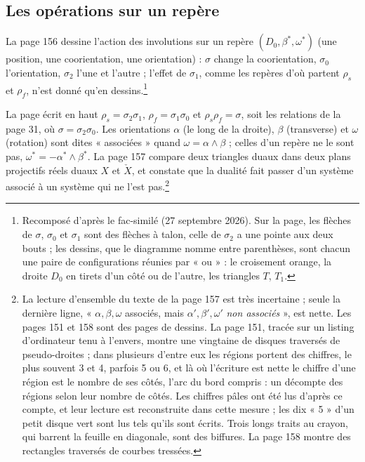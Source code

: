 \documentclass[11pt,a4paper]{article}
\begin{document}
\subsection*{Les opérations sur un repère}

La page 156 dessine l'action des involutions sur un repère $(D_0, \beta^{*},
\omega^{*})$ (une position, une coorientation, une orientation) : $\sigma$
change la coorientation, $\sigma_0$ l'orientation, $\sigma_2$ l'une et l'autre ;
l'effet de $\sigma_1$, comme les repères d'où partent $\rho_s$ et $\rho_f$, n'est
donné qu'en dessins.\footnote{Recomposé d'après le fac-similé (27 septembre
2026). Sur la page, les flèches de $\sigma$, $\sigma_0$ et $\sigma_1$ sont des
flèches à talon, celle de $\sigma_2$ a une pointe aux deux bouts ; les dessins,
que le diagramme nomme entre parenthèses, sont chacun une paire de
configurations réunies par « ou » : le croisement orange, la droite $D_0$ en
tirets d'un côté ou de l'autre, les triangles $T$, $T_1$.}


La page écrit en haut $\rho_s = \sigma_2\sigma_1$, $\rho_f = \sigma_1\sigma_0$ et
$\rho_s\rho_f = \sigma$, soit les relations de la page 31, où $\sigma = \sigma_2\sigma_0$. Les
orientations $\alpha$ (le long de la droite), $\beta$ (transverse) et $\omega$
(rotation) sont dites « associées » quand $\omega = \alpha \wedge \beta$ ; celles
d'un repère ne le sont pas, $\omega^{*} = -\alpha^{*} \wedge \beta^{*}$. La page
157 compare deux triangles duaux dans deux plans projectifs réels duaux $X$ et
$\check{X}$, et constate que la dualité fait passer d'un système associé à un
système qui ne l'est pas.\footnote{La lecture d'ensemble du texte de la page 157
est très incertaine ; seule la dernière ligne, « $\alpha, \beta, \omega$ associés,
mais $\alpha', \beta', \omega'$ \emph{non associés} », est nette. Les pages 151
et 158 sont des pages de dessins. La page 151, tracée sur un listing d'ordinateur
tenu à l'envers, montre une vingtaine de disques traversés de pseudo-droites ;
dans plusieurs d'entre eux les régions portent des chiffres, le plus souvent 3
et 4, parfois 5 ou 6, et là où l'écriture est nette le chiffre d'une région est
le nombre de ses côtés, l'arc du bord compris : un décompte des régions selon leur
nombre de côtés. Les chiffres pâles ont été lus d'après ce compte, et leur
lecture est reconstruite dans cette mesure ; les dix « 5 » d'un petit disque vert
sont lus tels qu'ils sont écrits. Trois longs traits au crayon, qui barrent la
feuille en diagonale, sont des biffures. La page 158 montre des rectangles
traversés de courbes tressées.}
\end{document}
